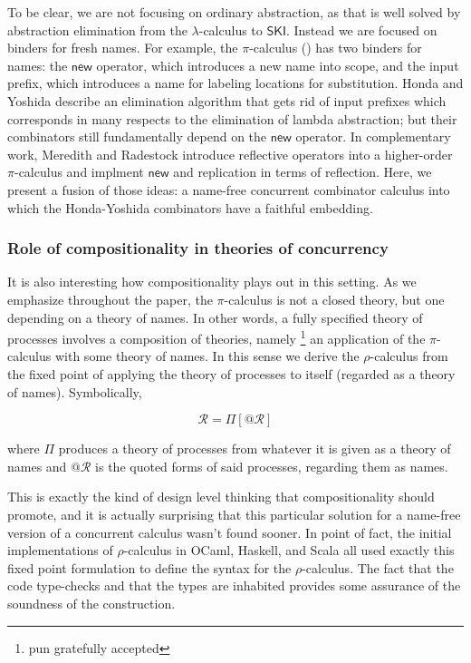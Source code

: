 \documentclass[submission,copyright,creativecommons]{eptcs}
\makeatletter
\newcommand{\new}{\mathsf{new}}
\newcommand{\pic}{$\pi$-calculus}
\newcommand{\quotep}[1]{\mathsf{@}#1}
\newcommand{\rhoc}{$\rho$-calculus}
\theoremstyle{definition}
\theoremstyle{remark}
\theoremstyle{remark}
\makeatother
\begin{document}
To be clear, we are not focusing on ordinary abstraction, as that is
well solved by abstraction elimination from the $\lambda$-calculus to
$\mathsf{SKI}$. Instead we are focused on binders for fresh
names. For example, the {\pic} (\cite{milner91polyadicpi}) has two
binders for names: the $\new$ operator, which introduces a new name
into scope, and the input prefix, which introduces a name for labeling
locations for substitution.  Honda and Yoshida
\cite{DBLP:conf/popl/HondaY94} \cite{DBLP:journals/tcs/Yoshida02}
describe an elimination algorithm that gets rid of input prefixes
which corresponds in many respects to the elimination of lambda
abstraction; but their combinators still fundamentally depend on the
$\new$ operator.  In complementary work, Meredith and Radestock
\cite{DBLP:journals/entcs/MeredithR05} introduce reflective operators
into a higher-order {\pic} and implment $\new$ and replication in
terms of reflection.  Here, we present a fusion of those ideas: a
name-free concurrent combinator calculus into which the Honda-Yoshida
combinators have a faithful embedding.

\subsubsection{Role of compositionality in theories of concurrency} 
It is also interesting how compositionality plays out in this
setting. As we emphasize throughout the paper, the {\pic\;} is not a
closed theory, but one depending on a theory of names. In other words,
a fully specified theory of processes involves a composition of
theories, namely \footnote{pun gratefully accepted} an application of
the {\pic\;} with some theory of names. In this sense we derive the
{\rhoc} \cite{DBLP:journals/entcs/MeredithR05} from the fixed point of
applying the theory of processes to itself (regarded as a theory of
names). Symbolically,

\begin{equation*}
  \mathcal{R} = \Pi[\quotep{\mathcal{R}}]
\end{equation*}

where $\Pi$ produces a theory of processes from whatever it is given
as a theory of names and $\quotep{\mathcal{R}}$ is the quoted forms of
said processes, regarding them as names.

This is exactly the kind of design level thinking that
compositionality should promote, and it is actually surprising that
this particular solution for a name-free version of a concurrent
calculus wasn't found sooner. In point of fact, the initial
implementations of {\rhoc} in \textsf{OCaml}, \textsf{Haskell}, and
\textsf{Scala} all used exactly this fixed point formulation to define the
syntax for the {\rhoc}. The fact that the code type-checks
and that the types are inhabited provides some assurance of the
soundness of the construction.
\end{document}

